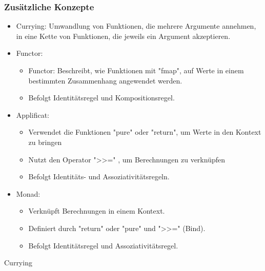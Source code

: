 \documentclass{beamer}
\begin{document}
\begin{frame}
\frametitle{Zusätzliche Konzepte }
	\begin{itemize}
			\item Currying: Umwandlung von Funktionen, die mehrere Argumente annehmen, in eine Kette von Funktionen, die jeweils ein Argument akzeptieren.
			\item Functor: \begin{itemize}
			    \item Functor: Beschreibt, wie Funktionen mit "fmap",  auf Werte in einem bestimmten Zusammenhang angewendet werden.
                    \item  Befolgt Identitätsregel und Kompositionsregel.
			\end{itemize}
                \item Applificat: \begin{itemize}
                    \item Verwendet die Funktionen   "pure" oder "return", um Werte in den Kontext zu bringen
                    \item Nutzt den Operator ">>=" , um Berechnungen zu verknüpfen
                    \item Befolgt Identitäts- und Assoziativitätsregeln.
                \end{itemize}
                \item Monad: \begin{itemize}
                    \item Verknüpft Berechnungen in einem Kontext.
                    \item Definiert durch "return" oder "pure" und ">>=" (Bind).
                    \item Befolgt Identitätsregel und Assoziativitätsregel.
                \end{itemize}
	\end{itemize}

\end{frame}

\begin{frame}{Currying}


\end{frame}
\end{document}
